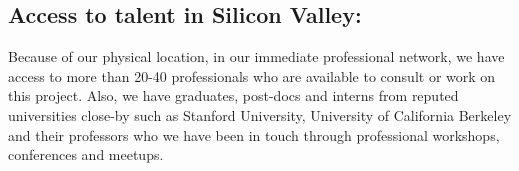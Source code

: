 \subsection*{Access to talent in Silicon Valley:}
Because of our physical location, in our immediate professional network, we have access to more than 20-40 professionals who are available to consult or work on
this project. Also, we have graduates, post-docs and  interns from reputed universities close-by such as Stanford
University, University of California Berkeley and their professors who we have been in touch through professional
workshops, conferences and meetups.
